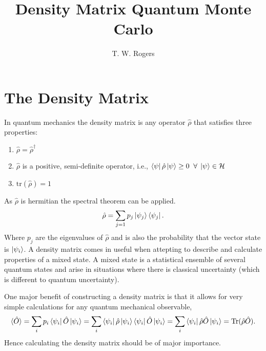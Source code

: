 \documentclass[12pt,a4paper]{article}
\begin{document}
\title{\bfseries \LARGE Density Matrix Quantum Monte Carlo}
\author{T. W. Rogers}
\maketitle

\section{The Density Matrix}
\nocite{Isham}
In quantum mechanics the density matrix is any operator $\hat{\rho}$ that satisfies three properties:
\begin{enumerate}
\item $\hat{\rho} = \hat{\rho}^{\dag}$
\item $\hat{\rho}$ is a positive, semi-definite operator, i.e., $\bra{\psi}\hat\rho\ket{\psi} \geq 0\; \; \forall\; \ket{\psi}\in\mathcal{H}$ 
\item $\mbox{tr}(\hat{\rho})=1$
\end{enumerate}
As $\hat{\rho}$ is hermitian the spectral theorem can be applied.
\begin{equation}
\hat{\rho} = \sum_{j=1}p_j\ket{\psi_j}\bra{\psi_j}.
\end{equation}
Where $p_j$ are the eigenvalues of $\hat{\rho}$ and is also the probability that the vector state is $\ket{\psi_i}$. A density matrix comes in useful when attepting to describe and calculate properties of a mixed state. A mixed state is a statistical ensemble of several quantum states and arise in situations where there is classical uncertainty (which is different to quantum uncertainty). 

One major benefit of constructing a density matrix is that it allows for very simple calculations for any quantum mechanical observable,
\begin{equation}
\langle\hat{O}\rangle=\sum_i p_i\bra{\psi_i}\hat{O}\ket{\psi_i}
=\sum_i \bra{\psi_i}\hat{\rho}\ket{\psi_i}\bra{\psi_i}\hat{O}\ket{\psi_i}
=\sum_i \bra{\psi_i}\hat{\rho}\hat{O}\ket{\psi_i}
=\mbox{Tr}(\hat{\rho}\hat{O}).
\end{equation}
Hence calculating the density matrix should be of major importance.
\end{document}
